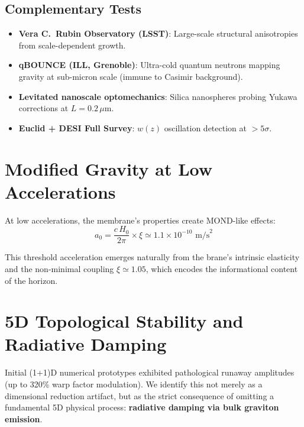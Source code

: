 \subsection{Complementary Tests}

\begin{itemize}
  \item \textbf{Vera C.\ Rubin Observatory (LSST)}: Large-scale structural anisotropies from scale-dependent growth.
  \item \textbf{qBOUNCE (ILL, Grenoble)}: Ultra-cold quantum neutrons mapping gravity at sub-micron scale (immune to Casimir background).
  \item \textbf{Levitated nanoscale optomechanics}: Silica nanospheres probing Yukawa corrections at $L = 0.2\,\mu$m.
  \item \textbf{Euclid + DESI Full Survey}: $w(z)$ oscillation detection at $> 5\sigma$.
\end{itemize}

\section{Modified Gravity at Low Accelerations}
\label{sec:modified_gravity}

At low accelerations, the membrane's properties create MOND-like effects:
\begin{equation}
a_0 = \frac{c\,H_0}{2\pi} \times \xi \simeq 1.1 \times 10^{-10}\text{ m/s}^2
\end{equation}

This threshold acceleration emerges naturally from the brane's intrinsic elasticity and the non-minimal coupling $\xi \simeq 1.05$, which encodes the informational content of the horizon.

\section{5D Topological Stability and Radiative Damping}
\label{sec:radiative_damping}

Initial (1+1)D numerical prototypes exhibited pathological runaway amplitudes (up to 320\% warp factor modulation). We identify this not merely as a dimensional reduction artifact, but as the strict consequence of omitting a fundamental 5D physical process: \textbf{radiative damping via bulk graviton emission}.

